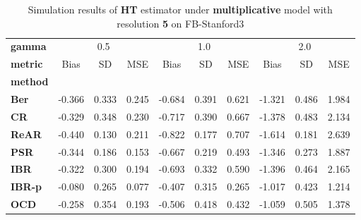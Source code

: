 \begin{table}
\centering
\caption{Simulation results of \textbf{HT} estimator under \textbf{multiplicative} model with resolution \textbf{5} on FB-Stanford3}
\begin{tabular}{lccccccccc}
\toprule
\textbf{gamma} & \multicolumn{3}{c}{0.5} & \multicolumn{3}{c}{1.0} & \multicolumn{3}{c}{2.0} \\
\textbf{metric} &   Bias &     SD &    MSE &   Bias &     SD &    MSE &   Bias &     SD &    MSE \\
\textbf{method} &        &        &        &        &        &        &        &        &        \\
\midrule
\textbf{Ber} & -0.366 &  0.333 &  0.245 & -0.684 &  0.391 &  0.621 & -1.321 &  0.486 &  1.984 \\
\textbf{CR} & -0.329 &  0.348 &  0.230 & -0.717 &  0.390 &  0.667 & -1.378 &  0.483 &  2.134 \\
\textbf{ReAR} & -0.440 &  0.130 &  0.211 & -0.822 &  0.177 &  0.707 & -1.614 &  0.181 &  2.639 \\
\textbf{PSR} & -0.344 &  0.186 &  0.153 & -0.667 &  0.219 &  0.493 & -1.346 &  0.273 &  1.887 \\
\textbf{IBR} & -0.322 &  0.300 &  0.194 & -0.693 &  0.332 &  0.590 & -1.396 &  0.464 &  2.165 \\
\textbf{IBR-p} & -0.080 &  0.265 &  0.077 & -0.407 &  0.315 &  0.265 & -1.017 &  0.423 &  1.214 \\
\textbf{OCD} & -0.258 &  0.354 &  0.193 & -0.506 &  0.418 &  0.432 & -1.059 &  0.505 &  1.378 \\
\bottomrule
\end{tabular}
\end{table}

